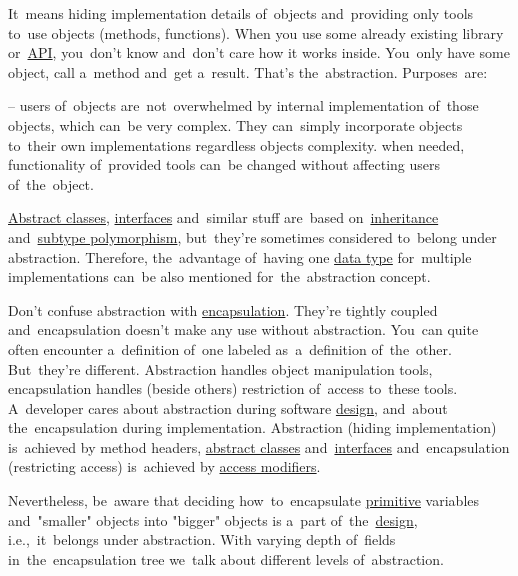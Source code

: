 \label{abstraction}
It~means hiding implementation details of~objects and~providing only tools to~use objects (methods, functions).
When you use some already existing library or~\hyperref[api]{API}, you~don't know and~don't care how it works inside.
You~only have some object, call a~method and~get a~result.
That's the~abstraction.
Purposes~are:
\begin{itemize}
     -- users of~objects are~not~overwhelmed by internal implementation of~those objects, which can~be very complex.
            They can~simply incorporate objects to~their own implementations regardless objects complexity.
     when needed, functionality of~provided tools can~be changed without affecting users of~the~object.
\end{itemize}

\warning \hyperref[javaabstractclasses]{Abstract classes}, \hyperref[javainterfaces]{interfaces} and~similar stuff are~based on~\hyperref[inheritance]{inheritance} and~\hyperref[polymorphism]{subtype polymorphism}, but~they're sometimes considered to~belong under abstraction.
Therefore, the~advantage of~having one \hyperref[datatypes]{data type} for~multiple implementations can~be also mentioned for~the~abstraction concept.

\warning Don't confuse abstraction with \hyperref[encapsulation]{encapsulation}.
They're tightly coupled and~encapsulation doesn't make any use without abstraction.
You~can quite often encounter a~definition of~one labeled as~a~definition of~the~other.
But~they're different.
Abstraction handles object manipulation tools, encapsulation handles (beside others) restriction of~access to~these tools.
A~developer cares about abstraction during software \hyperref[architecturedesign]{design}, and~about the~encapsulation during implementation.
Abstraction (hiding implementation) is~achieved by method headers, \hyperref[javaabstractclasses]{abstract classes} and~\hyperref[javainterfaces]{interfaces} and~encapsulation (restricting access) is~achieved by \hyperref[javaaccessmodifiers]{access modifiers}.

Nevertheless, be~aware that deciding how~to~encapsulate \hyperref[javaprimitivetypes]{primitive} variables and~"smaller" objects into "bigger" objects is a~part of~the~\hyperref[architecturedesign]{design}, i.e.,~it~belongs under abstraction.
With varying depth of~fields in~the~encapsulation tree we~talk about different levels of~abstraction.
\newpage

